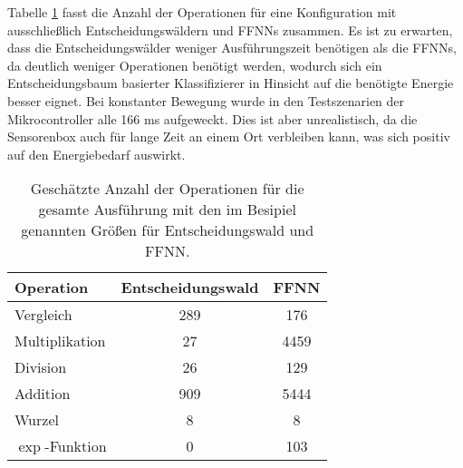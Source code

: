 \newpage
Tabelle \ref{tab:complexity_summary} fasst die Anzahl der Operationen für eine Konfiguration mit ausschließlich Entscheidungswäldern und FFNNs zusammen.
Es ist zu erwarten, dass die Entscheidungswälder weniger Ausführungszeit benötigen als die FFNNs, da deutlich weniger Operationen benötigt werden,
wodurch sich ein Entscheidungsbaum basierter Klassifizierer in Hinsicht auf die benötigte Energie besser eignet.
Bei konstanter Bewegung wurde in den Testszenarien der Mikrocontroller alle 166 ms aufgeweckt.
Dies ist aber unrealistisch, da die Sensorenbox auch für lange Zeit an einem Ort verbleiben kann, was sich positiv auf den Energiebedarf auswirkt.
\begin{table}[h!]
    \centering
    \begin{tabular}{ | l | c | c | }
        \hline
        Operation & Entscheidungswald & FFNN \\\hline
        Vergleich & 289 & 176 \\\hline
        Multiplikation & 27 & 4459 \\\hline
        Division & 26 & 129 \\\hline
        Addition & 909 & 5444 \\\hline
        Wurzel & 8 & 8 \\\hline
        $\exp$-Funktion & 0 & 103 \\\hline
    \end{tabular}
    \caption{Geschätzte Anzahl der Operationen für die gesamte Ausführung mit den im Besipiel genannten Größen für Entscheidungswald und FFNN.}
    \label{tab:complexity_summary}
\end{table}
